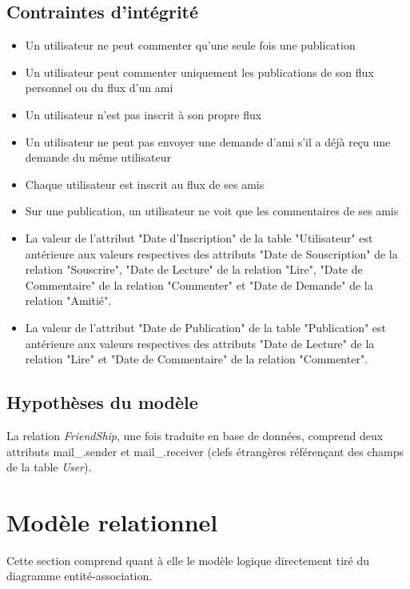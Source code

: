 \documentclass[a4paper,10pt]{article}
\begin{document}
\subsection{Contraintes d’intégrité}

	\begin{itemize}
	    \item Un utilisateur ne peut commenter qu'une seule fois une publication
	    \item Un utilisateur peut commenter uniquement les publications de son flux personnel ou du flux d'un ami
	    \item Un utilisateur n'est pas inscrit à son propre flux
	    \item Un utilisateur ne peut pas envoyer une demande d'ami s'il a déjà reçu une demande du même utilisateur 
	    \item Chaque utilisateur est inscrit au flux de ses amis
	    \item Sur une publication, un utilisateur ne voit que les commentaires de ses amis 
	    \item La valeur de l'attribut "Date d’Inscription" de la table "Utilisateur" est antérieure aux valeurs respectives des attributs "Date de Souscription" de la relation "Souscrire", "Date de Lecture" de la relation "Lire", "Date de Commentaire" de la relation "Commenter" et "Date de Demande" de la relation "Amitié".
	    \item La valeur de l'attribut "Date de Publication" de la table "Publication" est antérieure aux valeurs respectives des attributs "Date de Lecture" de la relation "Lire" et "Date de Commentaire" de la relation "Commenter".
	\end{itemize}

\subsection{Hypothèses du modèle}

La relation \textit{FriendShip}, une fois traduite en base de données, comprend deux attributs mail\_.sender et mail\_.receiver (clefs étrangères référençant des champs de la table \textit{User}).

\section{Modèle relationnel}

Cette section comprend quant à elle le modèle logique directement tiré du diagramme entité-association. 
\end{document}
